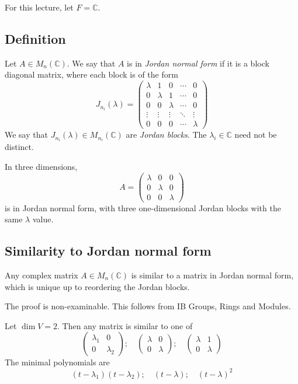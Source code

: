 For this lecture, let \( F = \mathbb C \).

\subsection{Definition}
\begin{definition}
	Let \( A \in M_n(\mathbb C) \).
	We say that \( A \) is in \textit{Jordan normal form} if it is a block diagonal matrix, where each block is of the form
	\[
		J_{n_i}(\lambda) =
		\begin{pmatrix}
			\lambda & 1       & 0       & \cdots & 0       \\
			0       & \lambda & 1       & \cdots & 0       \\
			0       & 0       & \lambda & \cdots & 0       \\
			\vdots  & \vdots  & \vdots  & \ddots & \vdots  \\
			0       & 0       & 0       & \cdots & \lambda
		\end{pmatrix}
	\]
	We say that \( J_{n_i}(\lambda) \in M_{n_i}(\mathbb C) \) are \textit{Jordan blocks}.
	The \( \lambda_i \in \mathbb C \) need not be distinct.
\end{definition}
\begin{remark}
	In three dimensions,
	\[
		A =
		\begin{pmatrix}
			\lambda & 0       & 0       \\
			0       & \lambda & 0       \\
			0       & 0       & \lambda
		\end{pmatrix}
	\]
	is in Jordan normal form, with three one-dimensional Jordan blocks with the same \( \lambda \) value.
\end{remark}

\subsection{Similarity to Jordan normal form}
\begin{theorem}
	Any complex matrix \( A \in M_n(\mathbb C) \) is similar to a matrix in Jordan normal form, which is unique up to reordering the Jordan blocks.
\end{theorem}
\noindent The proof is non-examinable.
This follows from IB Groups, Rings and Modules.
\begin{example}
	Let \( \dim V = 2 \).
	Then any matrix is similar to one of
	\[
		\begin{pmatrix}
			\lambda_1 & 0         \\
			0         & \lambda_2
		\end{pmatrix};\quad
		\begin{pmatrix}
			\lambda & 0       \\
			0       & \lambda
		\end{pmatrix};\quad
		\begin{pmatrix}
			\lambda & 1       \\
			0       & \lambda
		\end{pmatrix}
	\]
	The minimal polynomials are
	\[
		(t-\lambda_1)(t-\lambda_2);\quad (t-\lambda);\quad (t-\lambda)^2
	\]
\end{example}

